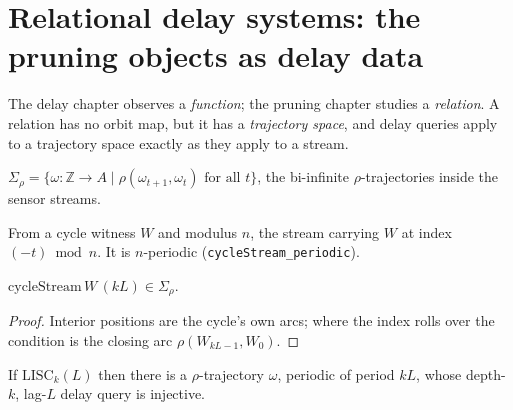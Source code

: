 \section{Relational delay systems: the pruning objects as delay data}
\label{sec:relational-delay}

The delay chapter observes a \emph{function}; the pruning chapter studies a
\emph{relation}. A relation has no orbit map, but it has a \emph{trajectory
space}, and delay queries apply to a trajectory space exactly as they apply to
a stream.

\begin{definition}
  \label{def:subshift}
  \leanok
  $\Sigma_{\rho} = \{\omega : \mathbb{Z} \to A \mid \rho(\omega_{t+1},
  \omega_t) \text{ for all } t\}$, the bi-infinite $\rho$-trajectories inside
  the sensor streams.
\end{definition}

\begin{definition}
  \label{def:cycle-stream}
  \leanok
  From a cycle witness $W$ and modulus $n$, the stream carrying $W$ at index
  $(-t) \bmod n$. It is $n$-periodic (\texttt{cycleStream\_periodic}).
\end{definition}

\begin{lemma}
  \label{lem:cycle-stream-subshift}
  \leanok
  $\mathrm{cycleStream}\,W\,(kL) \in \Sigma_{\rho}$.
\end{lemma}

\begin{proof}
  \leanok
  Interior positions are the cycle's own arcs; where the index rolls over the
  condition is the closing arc $\rho(W_{kL-1}, W_0)$.
\end{proof}

\begin{theorem}
  \label{thm:lisc-delay-witness}
  \leanok
  If $\mathrm{LISC}_k(L)$ then there is a $\rho$-trajectory $\omega$, periodic
  of period $kL$, whose depth-$k$, lag-$L$ delay query is injective.
\end{theorem}

